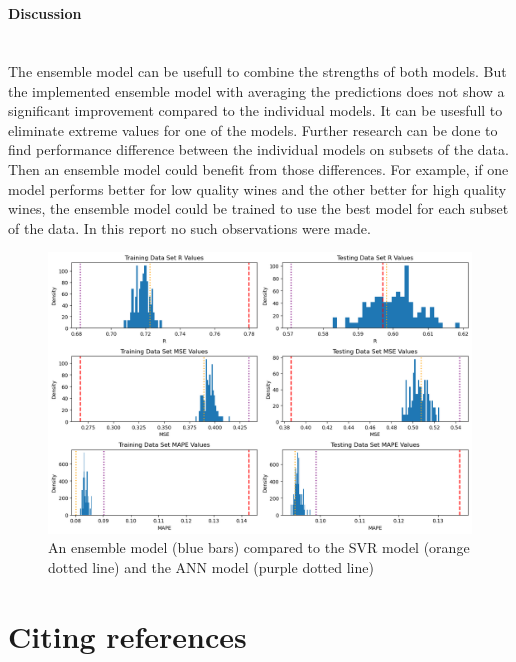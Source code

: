 \documentclass{article}
\newcommand{\subsubsubsection}[1]{%
  \paragraph{#1}\mbox{}\\}
\begin{document}
\subsubsubsection{Discussion}
The ensemble model can be usefull to combine the strengths of both models.
But the implemented ensemble model with averaging the predictions does not show a significant improvement compared to the individual models.
It can be usesfull to eliminate extreme values for one of the models.
Further research can be done to find performance difference between the individual models on subsets of the data.
Then an ensemble model could benefit from those differences.
For example, if one model performs better for low quality wines and the other better for high quality wines, the ensemble model could be trained to use the best model for each subset of the data.
In this report no such observations were made.

\begin{figure}
	\centering
	\includegraphics[width=\linewidth]{figures/ensemble_model_results.png}
	\caption{An ensemble model (blue bars) compared to the SVR model (orange dotted line) and the ANN model (purple dotted line)}
	\label{fig:ensemble-model}
\end{figure}

\section{Citing references}


\end{document}
